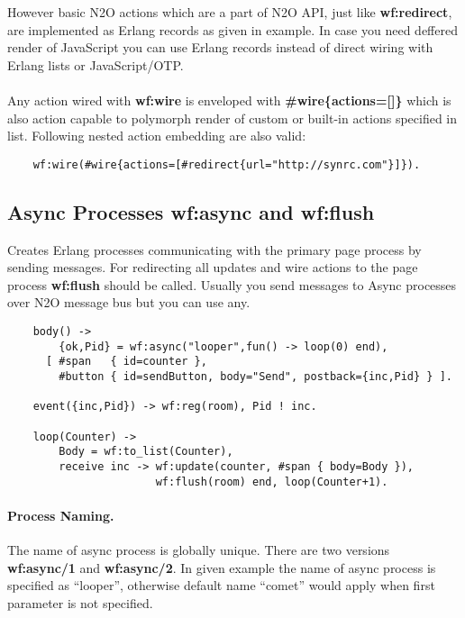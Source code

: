 However basic N2O actions which are a part of N2O API, just like {\bf wf:redirect},
are implemented as Erlang records as given in example. In case you need deffered
render of JavaScript you can use Erlang records instead of direct wiring with
Erlang lists or JavaScript/OTP.

\paragraph{}
Any action wired with {\bf wf:wire} is enveloped with {\bf \#wire\{actions=[]\}}
which is also action capable to polymorph render of custom or built-in actions specified in list.
Following nested action embedding are also valid:

\vspace{1\baselineskip}
\begin{lstlisting}
    wf:wire(#wire{actions=[#redirect{url="http://synrc.com"}]}).
\end{lstlisting}
\vspace{1\baselineskip}

\newpage
\subsection{Async Processes \bf{wf:async} and \bf{wf:flush}}
Creates Erlang processes communicating with the primary page
process by sending messages. For redirecting all updates and
wire actions to the page process {\bf wf:flush} should be called.
Usually you send messages to Async processes over N2O
message bus but you can use any.

\vspace{1\baselineskip}
\begin{lstlisting}
    body() ->
        {ok,Pid} = wf:async("looper",fun() -> loop(0) end),
      [ #span   { id=counter },
        #button { id=sendButton, body="Send", postback={inc,Pid} } ].

    event({inc,Pid}) -> wf:reg(room), Pid ! inc.

    loop(Counter) ->
        Body = wf:to_list(Counter),
        receive inc -> wf:update(counter, #span { body=Body }),
                       wf:flush(room) end, loop(Counter+1).
\end{lstlisting}

\paragraph{\bf Process Naming.} The name of async process is globally unique. There are two
versions {\bf wf:async/1} and {\bf wf:async/2}. In given example
the name of async process is specified as ``looper'', otherwise default name
``comet'' would apply when first parameter is not specified.

